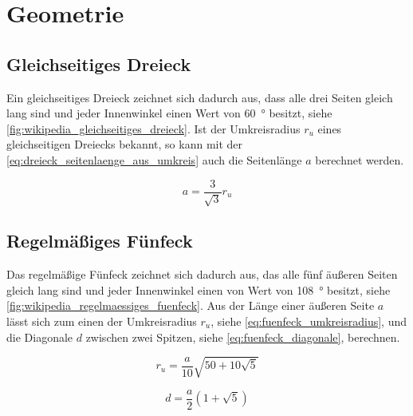 %
%
%
\section{Geometrie}


%
%
%
\subsection{Gleichseitiges Dreieck}

Ein gleichseitiges Dreieck zeichnet sich dadurch aus, dass alle drei Seiten gleich lang sind und jeder Innenwinkel einen Wert von \SI{60}{\degree} besitzt, siehe \autoref{fig:wikipedia_gleichseitiges_dreieck}. Ist der Umkreisradius $r_u$ eines gleichseitigen Dreiecks bekannt, so kann mit der \autoref{eq:dreieck_seitenlaenge_aus_umkreis} auch die Seitenlänge $a$ berechnet werden.

\begin{equation}
a = \frac{3}{\sqrt{3}} r_u \label{eq:dreieck_seitenlaenge_aus_umkreis}
\end{equation}


%
%
%
\subsection{Regelmäßiges Fünfeck}

Das regelmäßige Fünfeck zeichnet sich dadurch aus, das alle fünf äußeren Seiten gleich lang sind und jeder Innenwinkel einen von Wert von \SI{108}{\degree} besitzt, siehe \autoref{fig:wikipedia_regelmaessiges_fuenfeck}. Aus der Länge einer äußeren Seite $a$ lässt sich zum einen der Umkreisradius $r_u$, siehe \autoref{eq:fuenfeck_umkreisradius}, und die Diagonale $d$ zwischen zwei Spitzen, siehe \autoref{eq:fuenfeck_diagonale}, berechnen.

\begin{equation}
r_u = \frac{a}{10} \sqrt{50 + 10 \sqrt{5}} \label{eq:fuenfeck_umkreisradius}
\end{equation}

\begin{equation}
d = \frac{a}{2} \left(1 + \sqrt{5} \right) \label{eq:fuenfeck_diagonale}
\end{equation}


%
%
